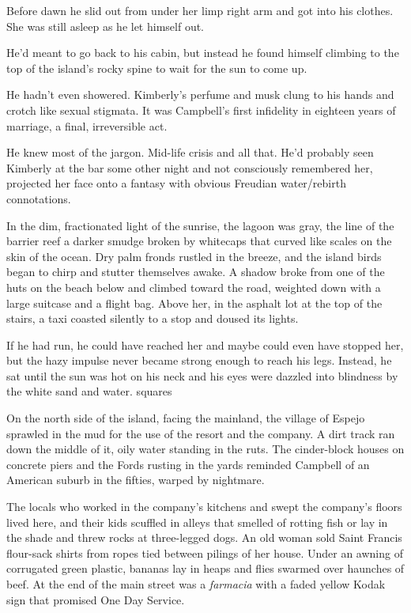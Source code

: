 Before dawn he slid out from under her limp right arm and got into his clothes. She was still asleep as he let himself out.

He'd meant to go back to his cabin, but instead he found himself climbing to the top of the island's rocky spine to wait for the sun to come up.

He hadn't even showered. Kimberly's perfume and musk clung to his hands and crotch like sexual stigmata. It was Campbell's first infidelity in eighteen years of marriage, a final, irreversible act.

He knew most of the jargon. Mid-life crisis and all that. He'd probably seen Kimberly at the bar some other night and not consciously remembered her, projected her face onto a fantasy with obvious Freudian water/rebirth connotations.

In the dim, fractionated light of the sunrise, the lagoon was gray, the line of the barrier reef a darker smudge broken by whitecaps that curved like scales on the skin of the ocean. Dry palm fronds rustled in the breeze, and the island birds began to chirp and stutter themselves awake. A shadow broke from one of the huts on the beach below and climbed toward the road, weighted down with a large suitcase and a flight bag. Above her, in the asphalt lot at the top of the stairs, a taxi coasted silently to a stop and doused its lights.

If he had run, he could have reached her and maybe could even have stopped her, but the hazy impulse never became strong enough to reach his legs. Instead, he sat until the sun was hot on his neck and his eyes were dazzled into blindness by the white sand and water.
squares

On the north side of the island, facing the mainland, the village of Espejo sprawled in the mud for the use of the resort and the company. A dirt track ran down the middle of it, oily water standing in the ruts. The cinder-block houses on concrete piers and the Fords rusting in the yards reminded Campbell of an American suburb in the fifties, warped by nightmare.

The locals who worked in the company's kitchens and swept the company's floors lived here, and their kids scuffled in alleys that smelled of rotting fish or lay in the shade and threw rocks at three-legged dogs. An old woman sold Saint Francis flour-sack shirts from ropes tied between pilings of her house. Under an awning of corrugated green plastic, bananas lay in heaps and flies swarmed over haunches of beef. At the end of the main street was a \textit{farmacia} with a faded yellow Kodak sign that promised One Day Service.

